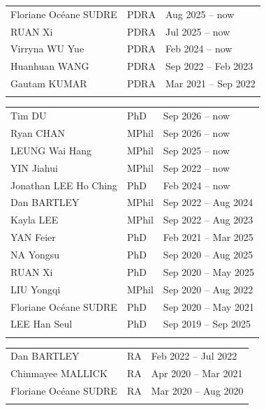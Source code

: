 \documentclass[letterpaper]{article}
\begin{document}
\begin{tabularx}{\textwidth}{XXX}
  Floriane Oc\'eane SUDRE & PDRA  & Aug 2025 -- now\\
  RUAN Xi                 & PDRA  & Jul 2025 -- now\\
  Virryna WU Yue          & PDRA  & Feb 2024 -- now\\
  Huanhuan WANG           & PDRA  & Sep 2022 -- Feb 2023\\
  Gautam KUMAR            & PDRA  & Mar 2021 -- Sep 2022\\
  \\
\end{tabularx}

\begin{tabularx}{\textwidth}{XXX}
  Tim DU                  & PhD   & Sep 2026 -- now\\
  Ryan CHAN               & MPhil & Sep 2026 -- now\\
  LEUNG Wai Hang          & MPhil & Sep 2025 -- now\\
  YIN Jiahui              & MPhil & Sep 2022 -- now\\
  Jonathan LEE Ho Ching   & PhD   & Feb 2024 -- now\\
  Dan BARTLEY             & MPhil & Sep 2022 -- Aug 2024\\
  Kayla LEE               & MPhil & Sep 2022 -- Aug 2023\\
  YAN Feier               & PhD   & Feb 2021 -- Mar 2025\\
  NA Yongsu               & PhD   & Sep 2020 -- Aug 2025\\
  RUAN Xi                 & PhD   & Sep 2020 -- May 2025\\
  LIU Yongqi              & MPhil & Sep 2020 -- Aug 2022\\
  Floriane Oc\'eane SUDRE & PhD   & Sep 2020 -- May 2021\\
  LEE Han Seul            & PhD   & Sep 2019 -- Sep 2025\\
  \\
\end{tabularx}

\begin{tabularx}{\textwidth}{XXX}
  Dan BARTLEY             & RA    & Feb 2022 -- Jul 2022\\
  Chinmayee MALLICK       & RA    & Apr 2020 -- Mar 2021\\
  Floriane Oc\'eane SUDRE & RA    & Mar 2020 -- Aug 2020\\
  \\
\end{tabularx}
\end{document}

